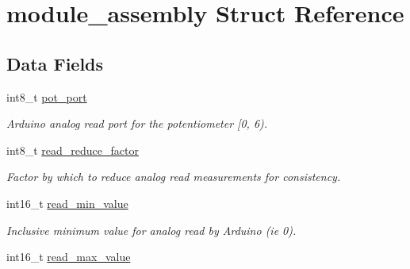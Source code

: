 \hypertarget{structmodule__assembly}{}\section{module\+\_\+assembly Struct Reference}
\label{structmodule__assembly}
\subsection*{Data Fields}
\begin{DoxyCompactItemize}
\item 
\hypertarget{structmodule__assembly_a1039e3f38f5f3f999cbea725176a7658}{}int8\+\_\+t \hyperlink{structmodule__assembly_a1039e3f38f5f3f999cbea725176a7658}{pot\+\_\+port}\label{structmodule__assembly_a1039e3f38f5f3f999cbea725176a7658}

\begin{DoxyCompactList}\small\item\em Arduino analog read port for the potentiometer \mbox{[}0, 6). \end{DoxyCompactList}\item 
\hypertarget{structmodule__assembly_a9d333b50d42e0c2256eb5f186013442f}{}int8\+\_\+t \hyperlink{structmodule__assembly_a9d333b50d42e0c2256eb5f186013442f}{read\+\_\+reduce\+\_\+factor}\label{structmodule__assembly_a9d333b50d42e0c2256eb5f186013442f}

\begin{DoxyCompactList}\small\item\em Factor by which to reduce analog read measurements for consistency. \end{DoxyCompactList}\item 
\hypertarget{structmodule__assembly_a476413fbb41a8a90abc4a5a492383aac}{}int16\+\_\+t \hyperlink{structmodule__assembly_a476413fbb41a8a90abc4a5a492383aac}{read\+\_\+min\+\_\+value}\label{structmodule__assembly_a476413fbb41a8a90abc4a5a492383aac}

\begin{DoxyCompactList}\small\item\em Inclusive minimum value for analog read by Arduino (ie 0). \end{DoxyCompactList}\item 
\hypertarget{structmodule__assembly_a4cb502f2d8b3ad893eeb769090bc6a2c}{}int16\+\_\+t \hyperlink{structmodule__assembly_a4cb502f2d8b3ad893eeb769090bc6a2c}{read\+\_\+max\+\_\+value}\label{structmodule__assembly_a4cb502f2d8b3ad893eeb769090bc6a2c}


\end{DoxyCompactItemize}
